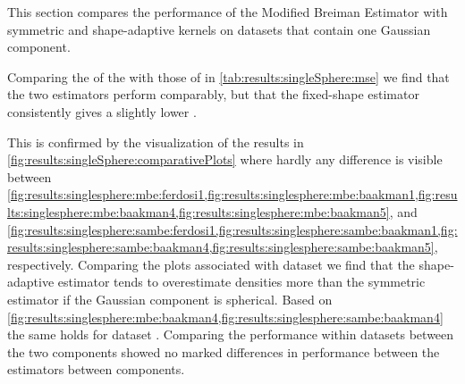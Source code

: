 
This section compares the performance of the Modified Breiman Estimator with symmetric and shape-adaptive kernels on datasets that contain one Gaussian component. 
	\begin{table}
		\centering
		
		\caption{Performance of the Modified Breiman Estimator with fixed-shaped and shape-adaptive kernels on the datasets with a single Gaussian component.} 	
		\label{tab:results:singleSphere:mse}
	\end{table}
	Comparing the \mses of the \mbe with those of \sambe in \cref{tab:results:singleSphere:mse} we find that the two estimators perform comparably, but that the fixed-shape estimator consistently gives a slightly lower \mse. 

	\begin{figure*}
		\centering
		
		\caption{The density as estimated by - \mbe and - \sambe as a function of the known density of datasets \ferdosiOne through \baakmanFive.}
		\label{fig:results:singleSphere:comparativePlots}
	\end{figure*}
	This is confirmed by the visualization of the results in \cref{fig:results:singleSphere:comparativePlots} where hardly any difference is visible between \cref{fig:results:singlesphere:mbe:ferdosi1,fig:results:singlesphere:mbe:baakman1,fig:results:singlesphere:mbe:baakman4,fig:results:singlesphere:mbe:baakman5}, and \cref{fig:results:singlesphere:sambe:ferdosi1,fig:results:singlesphere:sambe:baakman1,fig:results:singlesphere:sambe:baakman4,fig:results:singlesphere:sambe:baakman5}, respectively. 
		Comparing the plots associated with dataset \ferdosiOne we find that the shape-adaptive estimator tends to overestimate densities more than the symmetric estimator if the Gaussian component is spherical.
		Based on \cref{fig:results:singlesphere:mbe:baakman4,fig:results:singlesphere:sambe:baakman4} the same holds for dataset \baakmanFour. 
	Comparing the performance within datasets between the two components showed no marked differences in performance between the estimators between components.

